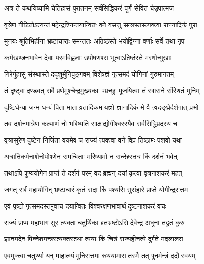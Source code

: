 
\twolineshloka
{अत्र ते कथयिष्यामि चेतिहासं पुरातनम्}
{सर्वसिद्धिकरं पूर्णं सेवितं चेन्नृपात्मज} %

\twolineshloka
{वृत्रेण पीडितोऽत्यन्तं महेन्द्रश्चिन्तयान्वितः}
{वने वसत्तु सन्त्रस्तस्त्यक्त्वा राज्यादिकं पुरा} %

\twolineshloka
{मुनयः श्रुतिभिर्हीना भ्रष्टाचाराः समन्ततः}
{अतिष्ठंस्ते भयोद्विग्ना वर्णाः सर्वे तथा नृप} %

\twolineshloka
{कर्मखण्डनभावेन देवाः परमविह्वलाः}
{उपोषणपरा भूत्वाऽतिष्ठंस्ते मरणोन्मुखाः} %

\twolineshloka
{गिरेर्गुहासु संस्थास्ते ददृशुर्मुनिपुङ्गवम्}
{विशेषज्ञं गृत्समदं योगिनां गुरुमागतम्} %

\twolineshloka
{तं दृष्ट्वा दण्डवत् सर्वे प्रणेमुश्चेन्द्रमुख्यकाः}
{पप्रच्छुः पूजयित्वा तं स्वासने संस्थितं मुनिम्} %


\twolineshloka
{दृष्टिर्धन्या जन्म धन्यं पिता माता व्रतादिकम्}
{यज्ञो ज्ञानादिकं मे वै त्वदङ्घ्रेर्दर्शनात् प्रभो} %

\twolineshloka
{तव दर्शनमात्रेण कल्याणं नो भविष्यति}
{साक्षाद्योगीश्वरस्यैव सर्वसिद्धिप्रदस्य च} %

\twolineshloka
{वृत्रासुरेण दुष्टेन निर्जिता वयमेव च}
{राज्यं त्यक्त्वा वने विप्र तिष्ठामः पशवो यथा} %

\twolineshloka
{अत्रातिकर्मनाशेनोपोषणेन समन्विताः}
{मरिष्यामो न सन्देहस्तत्र किं दर्शनं भवेत्} %

\twolineshloka
{तथाऽपि पुण्ययोगेन प्राप्तं ते दर्शनं परम्}
{वद ब्रह्मन् दयां कृत्वा वृत्रनाशकरं महत्} %

\twolineshloka
{जगत् सर्वं महायोगिन् भ्रष्टाचारं कृतं सदा}
{किं पश्यसि सुसंहारे प्राप्ते योगीन्द्रसत्तम} %


\twolineshloka
{एवं पृष्टो गृत्समदस्तमुवाच दयान्वितः}
{विश्वरक्षणभावार्थं दुष्टनाशकरं वचः} %


\twolineshloka
{राज्यं प्राप्य महाभाग सुर त्यक्ता चतुर्थिका}
{व्रतभ्रष्टोऽसि देवेन्द्र अधुना तद्व्रतं कुरु} %

\twolineshloka
{ज्ञानमदेन विघ्नेशमन्त्रस्त्यक्तस्तथा त्वया}
{किं चित्रं राज्यहीनत्वे दुर्मते मदलालस} %

\twolineshloka
{एवमुक्त्वा चतुर्थ्या यन् माहात्म्यं मुनिसत्तमः}
{कथयामास तस्मै तत् पुनर्मन्त्रं ददौ स्वयम्} %

